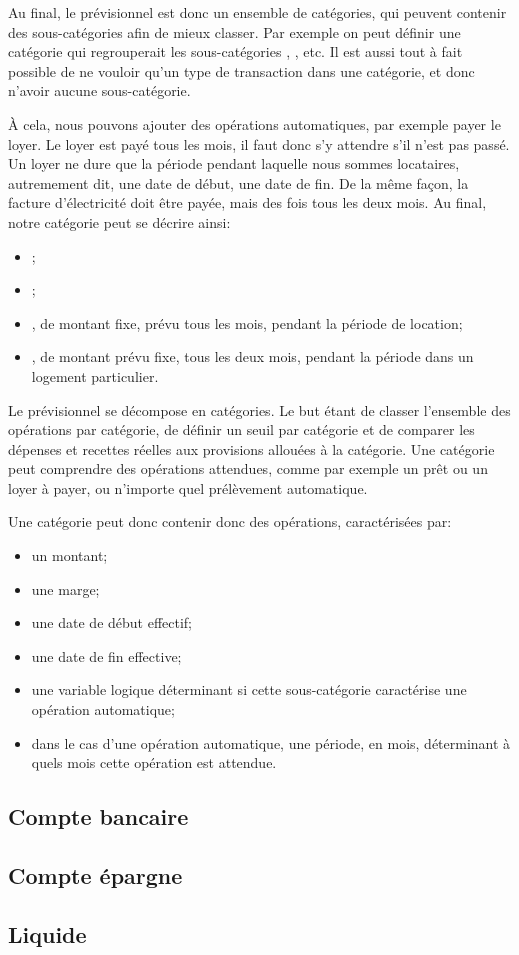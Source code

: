 Au final, le prévisionnel est donc un ensemble de catégories, qui
peuvent contenir des sous-catégories afin de mieux classer. Par
exemple on peut définir une catégorie 
qui regrouperait les sous-catégories ,
, etc. Il est aussi tout à fait possible
de ne vouloir qu'un type de transaction dans une catégorie, et
donc n'avoir aucune sous-catégorie.

\`A cela, nous pouvons ajouter des opérations automatiques, par
exemple payer le loyer. Le loyer est payé tous les mois, il faut
donc s'y attendre s'il n'est pas passé. Un loyer ne dure que la période
pendant laquelle nous sommes locataires, autremement dit, une date de
début, une date de fin. De la même façon, la facture d'électricité doit
être payée, mais des fois tous les deux mois. Au final, notre catégorie
 peut se décrire ainsi:
\begin{itemize}
\item {};
\item {};
\item {}, de montant fixe, prévu tous les mois, pendant la période
                           de location;
\item {}, de montant prévu fixe, tous les deux mois,
                                    pendant la période dans un logement particulier.
\end{itemize}



Le prévisionnel se décompose en catégories. Le but étant de classer 
l'ensemble des opérations par catégorie, de définir un seuil par 
catégorie et de comparer les dépenses et recettes réelles aux 
provisions allouées à la catégorie. Une catégorie peut comprendre 
des opérations attendues, comme par exemple un prêt ou un loyer à 
payer, ou n'importe quel prélèvement automatique.

Une catégorie peut donc contenir donc des opérations, caractérisées
par:
\begin{itemize}
\item un montant;
\item une marge;
\item une date de début effectif;
\item une date de fin effective;
\item une variable logique déterminant si cette sous-catégorie
        caractérise une opération automatique;
\item dans le cas d'une opération automatique, une période, en mois,
        déterminant à quels mois cette opération est attendue.
\end{itemize}

\subsection{Compte bancaire}
\subsection{Compte épargne}
\subsection{Liquide}

